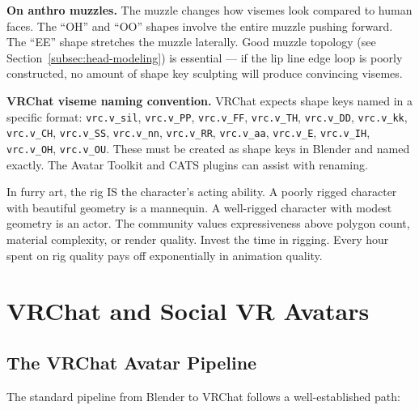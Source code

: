 \begin{furrybox}
\textbf{On anthro muzzles.} The muzzle changes how visemes look compared to human faces. The ``OH'' and ``OO'' shapes involve the entire muzzle pushing forward. The ``EE'' shape stretches the muzzle laterally. Good muzzle topology (see Section~\ref{subsec:head-modeling}) is essential --- if the lip line edge loop is poorly constructed, no amount of shape key sculpting will produce convincing visemes.
\end{furrybox}

\textbf{VRChat viseme naming convention.} VRChat expects shape keys named in a specific format: \texttt{vrc.v\_sil}, \texttt{vrc.v\_PP}, \texttt{vrc.v\_FF}, \texttt{vrc.v\_TH}, \texttt{vrc.v\_DD}, \texttt{vrc.v\_kk}, \texttt{vrc.v\_CH}, \texttt{vrc.v\_SS}, \texttt{vrc.v\_nn}, \texttt{vrc.v\_RR}, \texttt{vrc.v\_aa}, \texttt{vrc.v\_E}, \texttt{vrc.v\_IH}, \texttt{vrc.v\_OH}, \texttt{vrc.v\_OU}. These must be created as shape keys in Blender and named exactly. The Avatar Toolkit and CATS plugins can assist with renaming.

\begin{tipbox}
In furry art, the rig IS the character's acting ability. A poorly rigged character with beautiful geometry is a mannequin. A well-rigged character with modest geometry is an actor. The community values expressiveness above polygon count, material complexity, or render quality. Invest the time in rigging. Every hour spent on rig quality pays off exponentially in animation quality.
\end{tipbox}



\section{VRChat and Social VR Avatars}
\label{sec:furry-vrchat}

\subsection{The VRChat Avatar Pipeline}

The standard pipeline from Blender to VRChat follows a well-established path:

